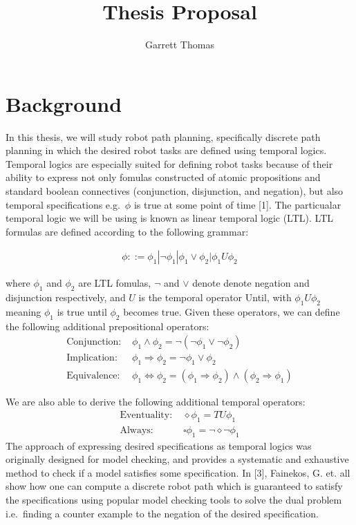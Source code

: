 \documentclass[11pt,a4paper]{article}
\title{Thesis Proposal}
\author{Garrett Thomas}
\begin{document}
\maketitle

\section{Background}
In this thesis, we will study robot path planning, specifically discrete path planning in which the desired robot tasks are defined using temporal logics. Temporal logics are especially suited for defining robot tasks because of their ability to express not only fomulas constructed of atomic propositions and standard boolean connectives (conjunction, disjunction, and negation), but also temporal specifications e.g.\ $\phi$ is true at some point of time [1]. The particualar temporal logic we will be using is known as linear temporal logic (LTL). LTL formulas are defined according to the following grammar:

\begin{align*}
    \phi ::= \phi_1 | \neg \phi_1 | \phi_1  \lor \phi_2 | \phi_1 U \phi_2
\end{align*}

where $\phi_1$ and $\phi_2$ are LTL fomulas, $\neg$ and $\lor$ denote denote negation and disjunction respectively, and $U$ is the temporal operator Until, with $\phi_1 U \phi_2$ meaning $\phi_1$ is true until $\phi_2$ becomes true. Given these operators, we can define the following additional prepositional operators:
\begin{align*}
    \text{Conjunction: }&  \phi_1  \land \phi_2 = \neg(\neg \phi_1 \lor \neg \phi_2) \\
    \text{Implication: }& \phi_1 \Rightarrow \phi_2 = \neg \phi_1 \lor \phi_2 \\
    \text{Equivalence: }& \phi_1 \Leftrightarrow \phi_2 = (\phi_1 \Rightarrow \phi_2) \land (\phi_2 \Rightarrow \phi_1)
\end{align*}

We are also able to derive the following additional temporal operators:
\begin{align*}
    \text{Eventuality: }& \diamond \phi_1 = T U \phi_1 \\
    \text{Always: }& \square \phi_1 = \neg \diamond \neg \phi_1
\end{align*}
The approach of expressing desired specifications as temporal logics was originally designed for model checking, and provides a systematic and exhaustive method to check if a model satisfies some specification. In [3], Fainekos, G. et. all show how one can compute a discrete robot path which is guaranteed to satisfy the specifications using popular model checking tools to solve the dual problem i.e.\ finding a counter example to the negation of the desired specification. 
\end{document}
